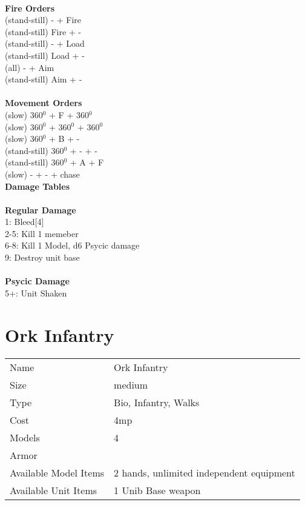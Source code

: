 \ \\ {\bf Fire Orders } \\
(stand-still) - + Fire \\
(stand-still) Fire + -  \\
(stand-still) - + Load \\
(stand-still) Load + - \\
(all) - + Aim \\
(stand-still) Aim + -  \\
\ \\ {\bf Movement Orders } \\
(slow) 360$^0$ + F + 360$^0$ \\
(slow) 360$^0$ + 360$^0$ + 360$^0$ \\
(slow) 360$^0$ + B + - \\
(stand-still) 360$^0$ + - + - \\
(stand-still) 360$^0$ + A + F \\
(slow) - + - + chase \\



{\bf Damage Tables} \\
\ \\ {\bf Regular Damage } \\
1: Bleed[4] \\
2-5: Kill 1 memeber \\
6-8: Kill 1 Model, d6 Psycic damage \\
9: Destroy unit base \\
\ \\ {\bf Psycic Damage } \\
5+: Unit Shaken \\









\pagebreak

\section{ Ork Infantry }

\begin{tabular}{ll}
  Name & Ork Infantry \\
  Size & medium\\
  Type & Bio, Infantry, Walks\\
  Cost & 4mp\\
  Models & 4\\
  Armor & \\
  Available Model Items & 2 hands, unlimited independent equipment \\
  Available Unit Items & 1 Unib Base weapon \\
\end{tabular}

